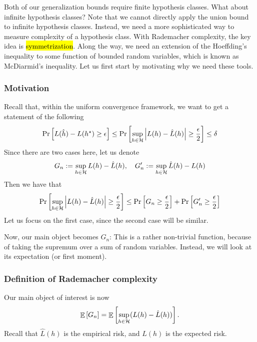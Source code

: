 Both of our generalization bounds require finite hypothesis classes. What about infinite hypothesis classes?
Note that we cannot directly apply the union bound to infinite hypothesis classes.
Instead, we need a more sophisticated way to measure complexity of a hypothesis class.
With Rademacher complexity, the key idea is \hl{symmetrization}. Along the way, we need an extension of the Hoeffding's inequality to some function of bounded random variables, which is known as McDiarmid's inequality.
Let us first start by motivating why we need these tools.

\subsubsection{Motivation}\label{subsubsec_motiv}

Recall that, within the uniform convergence framework, we want to get a statement of the following
\begin{align}
    \Pr\left[ L(\hat h) - L(h^{\star}) \ge \epsilon \right]
    \le \Pr\left[ \sup_{h\in\mathcal{H}} \left\lvert L(h) - \hat L(h)\right\rvert \ge \frac{\epsilon} 2 \right] \le \delta
\end{align}
Since there are two cases here, let us denote
\[ G_n := \sup_{h\in\mathcal{H}} L(h) - \hat L(h), \quad G'_n := \sup_{h\in\mathcal{H}} \hat L(h) - L(h) \]
Then we have that
\[ \Pr\left[\sup_{h\in\mathcal{H}} \left\lvert L(h) - \hat L(h)\right\rvert \ge \frac {\epsilon} 2 \right] 
\le \Pr\left[G_n \ge \frac {\epsilon} 2 \right] + \Pr\left[G'_n \ge \frac {\epsilon} 2\right] \]
Let us focus on the first case, since the second case will be similar.

Now, our main object becomes $G_n$: This is a rather non-trivial function, because of taking the supremum over a sum of random variables.
Instead, we will look at its expectation (or first moment).

\subsubsection{Definition of Rademacher complexity}

Our main object of interest is now \[ \mathop{\mathbb{E}}\left[ G_n \right] = \mathop{\mathbb{E}}\left[ \sup_{h\in\mathcal{H}} (L(h) - \hat L(h)) \right]. \]
Recall that $\hat L(h)$ is the empirical risk, and $L(h)$ is the expected risk.

